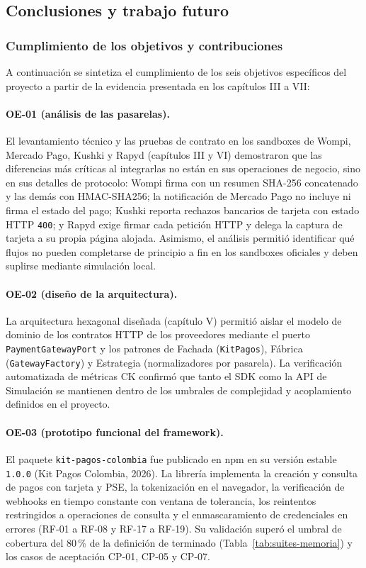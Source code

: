 \subsection{Conclusiones y trabajo futuro}
\subsubsection{Cumplimiento de los objetivos y contribuciones}
A continuación se sintetiza el cumplimiento de los seis objetivos específicos del proyecto a partir de la evidencia presentada en los capítulos III a VII:

\paragraph{OE-01 (análisis de las pasarelas).} El levantamiento técnico y las pruebas de contrato en los sandboxes de Wompi, Mercado Pago, Kushki y Rapyd (capítulos III y VI) demostraron que las diferencias más críticas al integrarlas no están en sus operaciones de negocio, sino en sus detalles de protocolo: Wompi firma con un resumen SHA-256 concatenado y las demás con HMAC-SHA256; la notificación de Mercado Pago no incluye ni firma el estado del pago; Kushki reporta rechazos bancarios de tarjeta con estado HTTP \texttt{400}; y Rapyd exige firmar cada petición HTTP y delega la captura de tarjeta a su propia página alojada. Asimismo, el análisis permitió identificar qué flujos no pueden completarse de principio a fin en los sandboxes oficiales y deben suplirse mediante simulación local.

\paragraph{OE-02 (diseño de la arquitectura).} La arquitectura hexagonal diseñada (capítulo V) permitió aislar el modelo de dominio de los contratos HTTP de los proveedores mediante el puerto \texttt{PaymentGatewayPort} y los patrones de Fachada (\texttt{KitPagos}), Fábrica (\texttt{GatewayFactory}) y Estrategia (normalizadores por pasarela). La verificación automatizada de métricas CK confirmó que tanto el SDK como la API de Simulación se mantienen dentro de los umbrales de complejidad y acoplamiento definidos en el proyecto.

\paragraph{OE-03 (prototipo funcional del framework).} El paquete \texttt{kit-pagos-colombia} fue publicado en npm en su versión estable \texttt{1.0.0} (Kit Pagos Colombia, 2026). La librería implementa la creación y consulta de pagos con tarjeta y PSE, la tokenización en el navegador, la verificación de webhooks en tiempo constante con ventana de tolerancia, los reintentos restringidos a operaciones de consulta y el enmascaramiento de credenciales en errores (RF-01 a RF-08 y RF-17 a RF-19). Su validación superó el umbral de cobertura del 80\,\% de la definición de terminado (Tabla~\ref{tab:suites-memoria}) y los casos de aceptación CP-01, CP-05 y CP-07.

